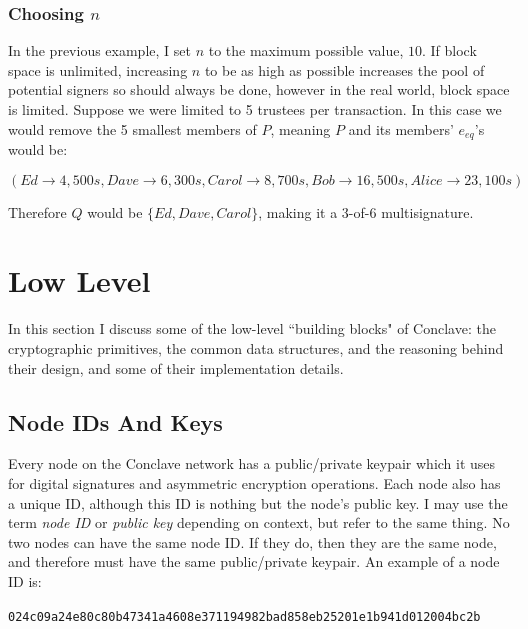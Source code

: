 \documentclass{report}
\begin{document}
			\subsubsection{Choosing $n$}
			
			In the previous example, I set $n$ to the maximum possible value, $10$. If block space is unlimited, increasing $n$ to be as high as possible increases the pool of potential signers so should always be done, however in the real world, block space is limited. Suppose we were limited to 5 trustees per transaction. In this case we would remove the 5 smallest members of $P$, meaning $P$ and its members' $e_{eq}$'s would be:
			
			\[(Ed \rightarrow 4,500s, Dave \rightarrow 6,300s, Carol \rightarrow 8,700s, Bob \rightarrow 16,500s, Alice \rightarrow 23,100s)\]
			
			Therefore $Q$ would be $\{Ed, Dave, Carol\}$, making it a 3-of-6 multisignature. 
			
	\section{Low Level}
		In this section I discuss some of the low-level ``building blocks" of Conclave: the cryptographic primitives, the common data structures, and the reasoning behind their design, and some of their implementation details.
		\subsection{Node IDs And Keys}
			Every node on the Conclave network has a public/private keypair which it uses for digital signatures and asymmetric encryption operations. Each node also has a unique ID, although this ID is nothing but the node's public key. I may use the term \textit{node ID} or \textit{public key} depending on context, but refer to the same thing. No two nodes can have the same node ID. If they do, then they are the same node, and therefore must have the same public/private keypair. An example of a node ID  is:
		\begin{center}
		  \texttt{024c09a24e80c80b47341a4608e371194982bad858eb25201e1b941d012004bc2b}
		\end{center}
		
\end{document}
